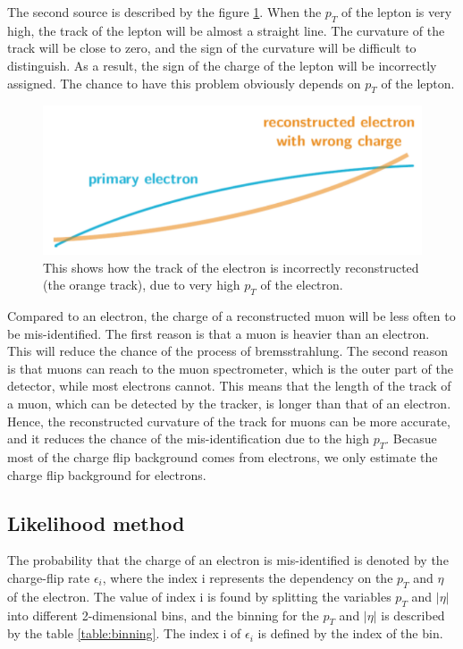 The second source is described by the figure \ref{fig:charge_flip_high_pt}.
When the $p_T$ of the lepton is very high, the track of the lepton will be almost a straight line.
The curvature of the track will be close to zero, and the sign of the curvature will be difficult to distinguish.
As a result, the sign of the charge of the lepton will be incorrectly assigned.
The chance to have this problem obviously depends on $p_T$ of the lepton.

\begin{figure}
\centering
\includegraphics[width=\textwidth]{data/photo/charge_flip/WrongTrack.png}
\caption{This shows how the track of the electron is incorrectly reconstructed (the orange track), due to very high $p_T$ of the electron.}
\label{fig:charge_flip_high_pt}
\end{figure}

Compared to an electron, the charge of a reconstructed muon will be less often to be mis-identified.
The first reason is that a muon is heavier than an electron.
This will reduce the chance of the process of bremsstrahlung.
The second reason is that muons can reach to the muon spectrometer, which is the outer part of the detector, while most electrons cannot.
This means that the length of the track of a muon, which can be detected by the tracker, is longer than that of an electron.
Hence, the reconstructed curvature of the track for muons can be more accurate, and it reduces the chance of the mis-identification due to the high $p_T$.
Becasue most of the charge flip background comes from electrons, we only estimate the charge flip background for electrons.

\subsection{Likelihood method}
\label{sec:likelihood_method}
The probability that the charge of an electron is mis-identified is denoted by the charge-flip rate $\epsilon_i$, where the index i represents the dependency on the $p_T$ and $\eta$ of the electron.
The value of index i is found by splitting the variables $p_T$ and $|\eta|$ into different 2-dimensional bins, and the binning for the $p_T$ and $|\eta|$ is described by the table \ref{table:binning}. The index i of $\epsilon_i$ is defined by the index of the bin.

